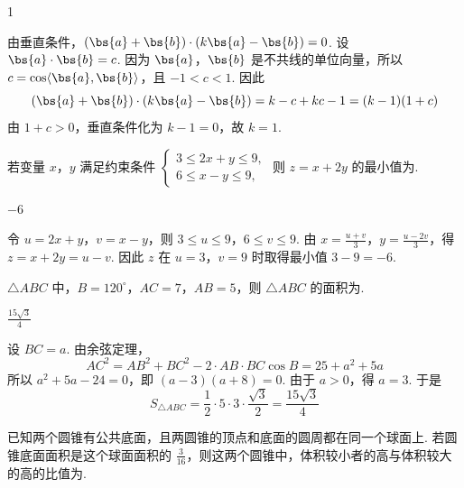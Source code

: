 \begin{answer}
1
\end{answer}

\begin{solution}
由垂直条件，\((\bs{a}+\bs{b})\cdot(k\bs{a}-\bs{b})=0\). 设 \(\bs{a}\cdot\bs{b}=c\). 因为 \(\bs{a}\)，\(\bs{b}\) 是不共线的单位向量，所以 \(c=\cos\langle\bs{a},\bs{b}\rangle\)，且 \(-1<c<1\). 因此
\[
(\bs{a}+\bs{b})\cdot(k\bs{a}-\bs{b})=k-c+kc-1=(k-1)(1+c)
\]
由 \(1+c>0\)，垂直条件化为 \(k-1=0\)，故 \(k=1\).
\end{solution}

\begin{problem}
若变量 \(x\)，\(y\) 满足约束条件 \(\begin{cases}
3 \leqslant 2x + y \leqslant 9,\\
6 \leqslant x - y \leqslant 9,
\end{cases}\) 则 \(z = x + 2y\) 的最小值为\fillinblank{}.
\end{problem}

\begin{answer}
\(-6\)
\end{answer}

\begin{solution}
令 \(u=2x+y\)，\(v=x-y\)，则 \(3\leqslant u\leqslant9\)，\(6\leqslant v\leqslant9\). 由 \(x=\frac{u+v}{3}\)，\(y=\frac{u-2v}{3}\)，得 \(z=x+2y=u-v\). 因此 \(z\) 在 \(u=3\)，\(v=9\) 时取得最小值 \(3-9=-6\).
\end{solution}

\begin{problem}
\(\triangle ABC\) 中，\(B = 120^{\circ}\)，\(AC = 7\)，\(AB = 5\)，则 \(\triangle ABC\) 的面积为\fillinblank{}.

\end{problem}

\begin{answer}
\(\frac{15\sqrt{3}}{4}\)
\end{answer}

\begin{solution}
设 \(BC=a\). 由余弦定理，
\[
AC^2=AB^2+BC^2-2\cdot AB\cdot BC\cos B
  =25+a^2+5a
\]
所以 \(a^2+5a-24=0\)，即 \((a-3)(a+8)=0\). 由于 \(a>0\)，得 \(a=3\). 于是
\[
S_{\triangle ABC}
 =\frac{1}{2}\cdot5\cdot3\cdot\frac{\sqrt{3}}{2}
 =\frac{15\sqrt{3}}{4}
\]
\end{solution}

\begin{problem}
已知两个圆锥有公共底面，且两圆锥的顶点和底面的圆周都在同一个球面上. 若圆锥底面面积是这个球面面积的 \(\frac{3}{16}\)，则这两个圆锥中，体积较小者的高与体积较大的高的比值为\fillinblank{}.

\end{problem}

